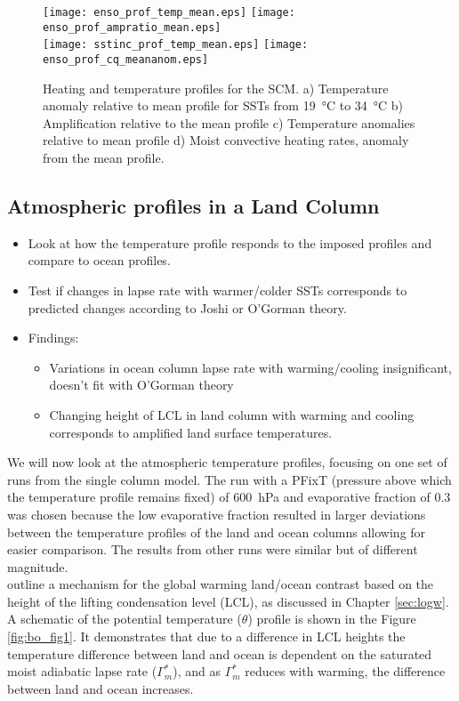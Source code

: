 \begin{figure}[ht]
\texttt{[image: enso\_prof\_temp\_mean.eps]}
\texttt{[image: enso\_prof\_ampratio\_mean.eps]}\\
\texttt{[image: sstinc\_prof\_temp\_mean.eps]}
\texttt{[image: enso\_prof\_cq\_meananom.eps]}
\caption{Heating and temperature profiles for the SCM. a) Temperature anomaly 
	relative to mean profile for SSTs from \SI{19}{\degreeCelsius} to 
	\SI{34}{\degreeCelsius} b) Amplification relative to the mean profile c) 
	Temperature anomalies relative to mean profile d) Moist convective heating 
rates, anomaly from the mean profile.}
\label{fig:scmsstprof}
\end{figure}

\subsection{Atmospheric profiles in a Land Column}
\begin{itemize}
	\item Look at how the temperature profile responds to the imposed profiles 
		and compare to ocean profiles.
	\item Test if changes in lapse rate with warmer/colder SSTs corresponds to 
		predicted changes according to Joshi or O'Gorman theory.
	\item Findings:
		\begin{itemize}
			\item Variations in ocean column lapse rate with warming/cooling 
				insignificant, doesn't fit with O'Gorman theory
			\item Changing height of LCL in land column with warming and cooling 
				corresponds to amplified land surface temperatures.
		\end{itemize}
	\end{itemize}

We will now look at the atmospheric temperature profiles, focusing on one set of 
runs from the single column model. The run with a PFixT (pressure above which 
the temperature profile remains fixed) of \SI{600}{\hecto\pascal} and 
evaporative fraction of 0.3 was chosen because the low evaporative fraction 
resulted in larger deviations between the temperature profiles of the land and 
ocean columns allowing for easier comparison. The results from other runs were 
similar but of different magnitude. \\
\citet{Byrne2013a} outline a mechanism for the global warming land/ocean 
contrast based on the height of the lifting condensation level (LCL), as 
discussed in Chapter \ref{sec:logw}. A schematic of the potential temperature 
($\theta$) profile is shown in the Figure \ref{fig:bo_fig1}. It demonstrates 
that due to a difference in LCL heights the temperature difference between land 
and ocean is dependent on the saturated moist adiabatic lapse rate 
($\Gamma_m^*$), and as $\Gamma_m^*$ reduces with warming, the difference between 
land and ocean increases.

